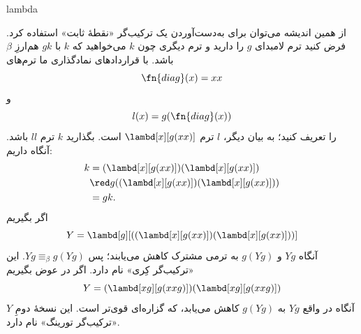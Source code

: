 \documentclass[../../../include/open-logic-section]{subfiles}
\begin{document}
\begin{tagblock}{lambda}
\begin{digress}
از همین اندیشه می‌توان برای به‌دست‌آوردن یک ترکیب‌گر «نقطهٔ ثابت»
استفاده کرد. فرض کنید ترم لامبدای $g$ را دارید و ترم دیگری چون $k$
می‌خواهید که $k$ با $gk$ هم‌ارزِ $\beta$ باشد. با قراردادهای
نمادگذاری ما ترم‌های
\[
\fn{diag}(x) = xx
\]
و
\[
l(x) = g(\fn{diag}(x))
\]
را تعریف کنید؛ به بیان دیگر، $l$ ترم $\lambd[x][g(xx)]$ است. بگذارید
$k$ ترم $ll$ باشد. آنگاه داریم:
\begin{align*}
k & = (\lambd[x][g(xx)])(\lambd[x][g(xx)]) \\
& \red  g((\lambd[x][g(xx)])(\lambd[x][g(xx)])) \\
& = gk.
\end{align*}
اگر بگیریم
\[
Y = \lambd[g][((\lambd[x][g(xx)])(\lambd[x][g(xx)]))]
\]
آنگاه $Yg$ و $g(Yg)$ به ترمی مشترک کاهش می‌یابند؛ پس
$Yg\equiv_\beta g(Yg)$. این «ترکیب‌گر کِری» نام دارد. اگر در عوض
بگیریم
\[
Y = (\lambd[xg][g(xxg)])(\lambd[xg][g(xxg)])
\]
آنگاه در واقع $Yg$ به $g(Yg)$ کاهش می‌یابد، که گزاره‌ای قوی‌تر است.
این نسخهٔ دومِ $Y$ «ترکیب‌گر تورینگ» نام دارد.
\end{digress}
\end{tagblock}
\end{document}
